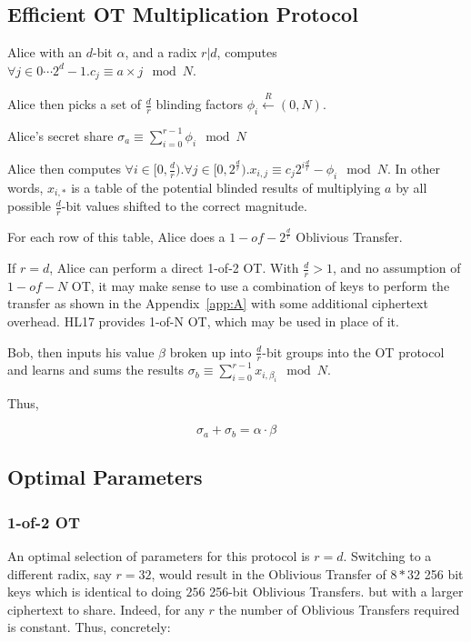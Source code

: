 \documentclass{article}
\begin{document}
\subsection{Efficient OT Multiplication Protocol}

Alice with an $d$-bit $\alpha$, and a radix $r | d$, computes $\forall j \in 0\cdots 2^d -1. c_j \equiv  a \times j \mod N$.

Alice then picks a set of $\frac{d}{r}$ blinding factors $\phi_i \xleftarrow{R} (0, N)$.

Alice's secret share $\sigma_a \equiv \sum\limits_{i=0}^{r-1} \phi_i \mod N$

Alice then computes $\forall i \in [0, \frac{d}{r}). \forall j \in [0, 2^{\frac{d}{r}}). x_{i, j} \equiv c_j 2^{i\frac{d}{r}} - \phi_i \mod N$. In other words, $x_{i,*}$ is a table of the potential blinded results of multiplying $a$ by all possible $\frac{d}{r}$-bit values shifted to the correct magnitude.

For each row of this table, Alice does a $1-of-2^\frac{d}{r}$ Oblivious Transfer. 

If $r = d$, Alice can perform a direct 1-of-2 OT. With $\frac{d}{r} > 1$, and no assumption of $1-of-N$ OT, it may make sense to use a combination of keys to perform the transfer as shown in the Appendix~\ref{app:A} with some additional ciphertext overhead. HL17 provides 1-of-N OT, which may be used in place of it.




Bob, then inputs his value $\beta$ broken up into $\frac{d}{r}$-bit groups into the OT protocol and learns and sums the results $\sigma_b \equiv \sum\limits_{i=0}^{r-1} x_{i, \beta_i} \mod N$.

Thus,

$$\sigma_a + \sigma_b = \alpha \cdot \beta$$


\subsection{Optimal Parameters}
\subsubsection{1-of-2 OT}
An optimal selection of parameters for this protocol is $r=d$. Switching to a different radix, say $r=32$, would result in the Oblivious Transfer of $8*32$ 256 bit keys which is identical to doing $256$ 256-bit Oblivious Transfers. but with a larger ciphertext to share. Indeed, for any $r$ the number of Oblivious Transfers required is constant. Thus, concretely:
\end{document}
